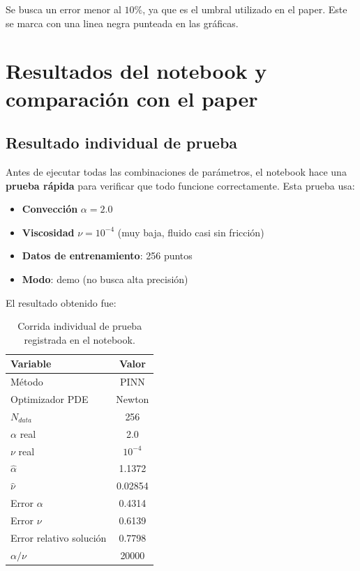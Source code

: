 \documentclass[10pt,letterpaper,twocolumn]{article}
\begin{document}
Se busca un error menor al $10\%$, ya que es el umbral utilizado en el paper. Este se marca con una linea negra punteada en las gráficas.

\section{Resultados del notebook y comparación con el paper}

\subsection{Resultado individual de prueba}

Antes de ejecutar todas las combinaciones de parámetros, el notebook hace una \textbf{prueba rápida} para verificar que todo funcione correctamente. Esta prueba usa:

\begin{itemize}
    \item \textbf{Convección} \( \alpha = 2.0 \)
    \item \textbf{Viscosidad} \( \nu = 10^{-4} \) (muy baja, fluido casi sin fricción)
    \item \textbf{Datos de entrenamiento}: 256 puntos 
    \item \textbf{Modo}: demo (no busca alta precisión)
\end{itemize}

El resultado obtenido fue:

\begin{table}[H]
\centering
\caption{Corrida individual de prueba registrada en el notebook.}
\begin{tabular}{lc}
\toprule
Variable & Valor \\
\midrule
Método & PINN \\
Optimizador PDE & Newton \\
$N_{data}$ & 256 \\
$\alpha$ real & 2.0 \\
$\nu$ real & $10^{-4}$ \\
$\widehat{\alpha}$ & 1.1372 \\
$\widehat{\nu}$ & 0.02854 \\
Error $\alpha$ & 0.4314 \\
Error $\nu$ & 0.6139 \\
Error relativo solución & 0.7798 \\
$\alpha/\nu$ & 20000 \\
\bottomrule
\end{tabular}
\end{table}
\end{document}
